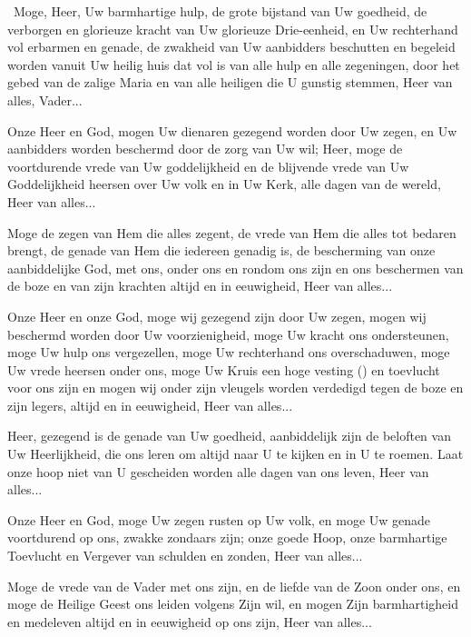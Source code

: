 \documentclass[12pt,twoside,a5paper]{article}
\begin{document}
\begin{halfparskip}
  \cc~Moge, Heer, Uw barmhartige hulp, de grote bijstand van Uw goedheid, de verborgen en glorieuze kracht van Uw glorieuze Drie-eenheid, en Uw rechterhand vol erbarmen en genade, de zwakheid van Uw aanbidders beschutten en begeleid worden vanuit Uw heilig huis dat vol is van alle hulp en alle zegeningen, door het gebed van de zalige Maria en van alle heiligen die U gunstig stemmen, Heer van alles, Vader...

   Onze Heer en God, mogen Uw dienaren gezegend worden door Uw zegen, en Uw aanbidders worden beschermd door de zorg van Uw wil; Heer, moge de voortdurende vrede van Uw goddelijkheid en de blijvende vrede van Uw Goddelijkheid heersen over Uw volk en in Uw Kerk, alle dagen van de wereld, Heer van alles...

   Moge de zegen van Hem die alles zegent, de vrede van Hem die alles tot bedaren brengt, de genade van Hem die iedereen genadig is, de bescherming van onze aanbiddelijke God, met ons, onder ons en rondom ons zijn en ons beschermen van de boze en van zijn krachten altijd en in eeuwigheid, Heer van alles...

   Onze Heer en onze God, moge wij gezegend zijn door Uw zegen, mogen wij beschermd worden door Uw voorzienigheid, moge Uw kracht ons ondersteunen, moge Uw hulp ons vergezellen, moge Uw rechterhand ons overschaduwen, moge Uw vrede heersen onder ons, moge Uw Kruis een hoge vesting () en toevlucht voor ons zijn en mogen wij onder zijn vleugels worden verdedigd tegen de boze en zijn legers, altijd en in eeuwigheid, Heer van alles...

   Heer, gezegend is de genade van Uw goedheid, aanbiddelijk zijn de beloften van Uw Heerlijkheid, die ons leren om altijd naar U te kijken en in U te roemen. Laat onze hoop niet van U gescheiden worden alle dagen van ons leven, Heer van alles...

   Onze Heer en God, moge Uw zegen rusten op Uw volk, en moge Uw genade voortdurend op ons, zwakke zondaars zijn; onze goede Hoop, onze barmhartige Toevlucht en Vergever van schulden en zonden, Heer van alles...

   Moge de vrede van de Vader met ons zijn, en de liefde van de Zoon onder ons, en moge de Heilige Geest ons leiden volgens Zijn wil, en mogen Zijn barmhartigheid en medeleven altijd en in eeuwigheid op ons zijn, Heer van alles...


\end{halfparskip}
\end{document}
